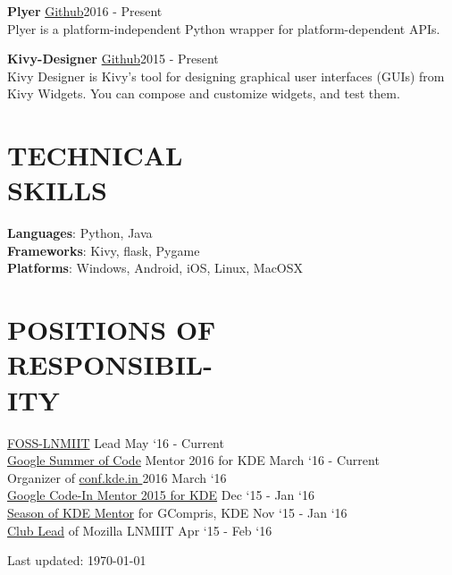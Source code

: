 \documentclass[margin]{res}
\begin{document}
\begin{resume}
    {\textbf{Plyer} \href{https://github.com/kivy/plyer}{ Github}\hfill 2016 - Present \\
    Plyer is a platform-independent Python wrapper for platform-dependent APIs.

    {\textbf{Kivy-Designer} \href{https://github.com/kivy/kivy-designer}{ Github}\hfill 2015 - Present \\
    Kivy Designer is Kivy's tool for designing graphical user interfaces (GUIs) from Kivy Widgets. You can compose and customize widgets, and test them.\
      
\section{TECHNICAL \\ SKILLS} {\textbf{Languages}:} Python, Java\\
    {\textbf{Frameworks}:} Kivy, flask, Pygame\\
    {\textbf{Platforms}:} Windows, Android, iOS, Linux, MacOSX

\section{POSITIONS OF\\ RESPONSIBIL-\\ITY}
    \href{http://fosslnmiit.github.io}{FOSS-LNMIIT} Lead \hfill May `16 - Current \\
    \href{https://summerofcode.withgoogle.com/projects/#4904227189030912}{Google Summer of Code} Mentor 2016 for KDE \hfill March `16 - Current\\
    Organizer of \href{http://conf.kde.in}{conf.kde.in }2016 \hfill March `16 \\
    \href{https://developers.google.com/open-source/gci/}{Google Code-In Mentor 2015 for KDE} \hfill Dec `15 - Jan `16\\
    \href{https://season.kde.org/?q=view_projects&prg=36&p=491}{Season of KDE Mentor} for GCompris, KDE \hfill Nov `15 - Jan `16\\
    \href{https://medium.com/@mozlnmiit}{Club Lead} of Mozilla LNMIIT \hfill Apr `15 - Feb `16\\
    

\begin{center}
  \begin{footnotesize}
    Last updated: \today \\
  \end{footnotesize}
\end{center}
}
}
\end{resume}
\end{document}
